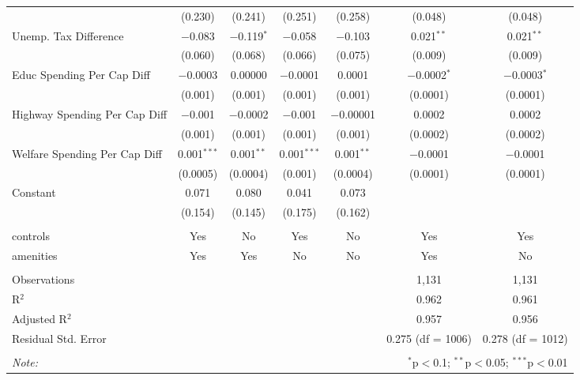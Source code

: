 \begin{table}[!htbp]
\begin{tabular}{@{\extracolsep{5pt}}lcccccc}
  & (0.230) & (0.241) & (0.251) & (0.258) & (0.048) & (0.048) \\ 
  Unemp. Tax Difference & $-$0.083 & $-$0.119$^{*}$ & $-$0.058 & $-$0.103 & 0.021$^{**}$ & 0.021$^{**}$ \\ 
  & (0.060) & (0.068) & (0.066) & (0.075) & (0.009) & (0.009) \\ 
  Educ Spending Per Cap Diff & $-$0.0003 & 0.00000 & $-$0.0001 & 0.0001 & $-$0.0002$^{*}$ & $-$0.0003$^{*}$ \\ 
  & (0.001) & (0.001) & (0.001) & (0.001) & (0.0001) & (0.0001) \\ 
  Highway Spending Per Cap Diff & $-$0.001 & $-$0.0002 & $-$0.001 & $-$0.00001 & 0.0002 & 0.0002 \\ 
  & (0.001) & (0.001) & (0.001) & (0.001) & (0.0002) & (0.0002) \\ 
  Welfare Spending Per Cap Diff & 0.001$^{***}$ & 0.001$^{**}$ & 0.001$^{***}$ & 0.001$^{**}$ & $-$0.0001 & $-$0.0001 \\ 
  & (0.0005) & (0.0004) & (0.001) & (0.0004) & (0.0001) & (0.0001) \\ 
  Constant & 0.071 & 0.080 & 0.041 & 0.073 &  &  \\ 
  & (0.154) & (0.145) & (0.175) & (0.162) &  &  \\ 
 \hline \\[-1.8ex] 
controls & Yes & No & Yes & No & Yes & Yes \\ 
amenities & Yes & Yes & No & No & Yes & No \\ 
\hline \\[-1.8ex] 
Observations &  &  &  &  & 1,131 & 1,131 \\ 
R$^{2}$ &  &  &  &  & 0.962 & 0.961 \\ 
Adjusted R$^{2}$ &  &  &  &  & 0.957 & 0.956 \\ 
Residual Std. Error &  &  &  &  & 0.275 (df = 1006) & 0.278 (df = 1012) \\ 
\hline 
\hline \\[-1.8ex] 
\textit{Note:}  & \multicolumn{6}{r}{$^{*}$p$<$0.1; $^{**}$p$<$0.05; $^{***}$p$<$0.01} \\ 
\end{tabular} 
\end{table} 
